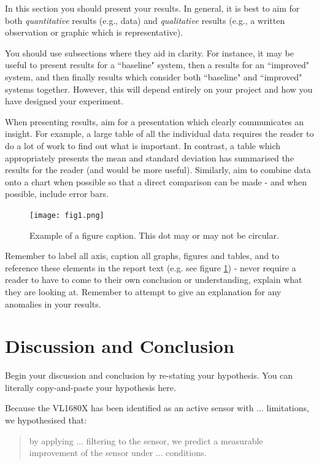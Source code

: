 \documentclass[conference]{IEEEtran}
\begin{document}
In this section you should present your results.  In general, it is best to aim for both \emph{quantitative} results (e.g., data) and \emph{qualitative} results (e.g., a written observation or graphic which is representative).  

You should use subsections where they aid in clarity.  For instance, it may be useful to present results for a ``baseline" system, then a results for an ``improved" system, and then finally results which consider both ``baseline" and ``improved" systems together.  However, this will depend entirely on your project and how you have designed your experiment.

When presenting results, aim for a presentation which clearly communicates an insight. For example, a large table of all the individual data requires the reader to do a lot of work to find out what is important.  In contrast, a table which appropriately presents the mean and standard deviation has summarised the results for the reader (and would be more useful).  Similarly, aim to combine data onto a chart when possible so that a direct comparison can be made - and when possible, include error bars.  

\begin{figure}[htbp]
\centerline{\texttt{[image: fig1.png]}}
\caption{Example of a figure caption.  This dot may or may not be circular.}
\label{fig1}
\end{figure}

Remember to label all axis, caption all graphs, figures and tables, and to reference these elements in the report text (e.g. see figure \ref{fig1}) - never require a reader to have to come to their own conclusion or understanding, explain what they are looking at.  Remember to attempt to give an explanation for any anomalies in your results.  


\section{Discussion and Conclusion}

Begin your discussion and conclusion by re-stating your hypothesis.  You can literally copy-and-paste your hypothesis here.  

Because the VL1680X has been identified as an active sensor with ... limitations, we hypothesised that:
\begin{quote}
    by applying ... filtering to the sensor, we predict a measurable improvement of the sensor under ... conditions.  
\end{quote}
\end{document}
